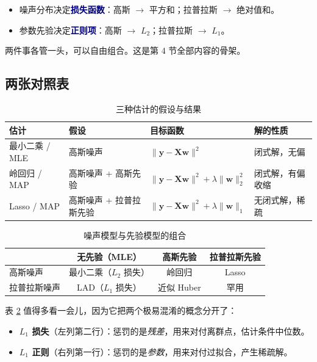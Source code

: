 \documentclass[11pt,a4paper,fontset=windows,zihao=-4]{ctexart}
\newcommand{\bX}{\mathbf{X}}
\newcommand{\by}{\mathbf{y}}
\newcommand{\bw}{\mathbf{w}}
\newcommand{\norm}[1]{\lVert #1\rVert}
\newcommand{\hl}[1]{\textcolor{navy}{\textbf{#1}}}
\newcommand{\tabhead}{\sffamily\bfseries\color{navy}}
\begin{document}
\begin{keybox}[对称的美感]
\begin{itemize}
  \item 噪声分布决定\hl{损失函数}：高斯 $\to$ 平方和；拉普拉斯 $\to$ 绝对值和。
  \item 参数先验决定\hl{正则项}：高斯 $\to$ $L_2$；拉普拉斯 $\to$ $L_1$。
\end{itemize}
两件事各管一头，可以自由组合。这是第 4 节全部内容的骨架。
\end{keybox}

\subsection{两张对照表}

\begin{table}[htbp]
\centering
\small
\caption{三种估计的假设与结果}
\label{tab:three}
\begin{tabular}{@{}llll@{}}
\toprule
\rowcolor{navy!7}
\tabhead 估计 & \tabhead 假设 & \tabhead 目标函数 & \tabhead 解的性质\\
\midrule
最小二乘 / MLE & 高斯噪声 & $\norm{\by-\bX\bw}^2$ & 闭式解，无偏\\
岭回归 / MAP & 高斯噪声 + 高斯先验 & $\norm{\by-\bX\bw}^2+\lambda\norm{\bw}_2^2$ & 闭式解，有偏收缩\\
Lasso / MAP & 高斯噪声 + 拉普拉斯先验 & $\norm{\by-\bX\bw}^2+\lambda\norm{\bw}_1$ & 无闭式解，稀疏\\
\bottomrule
\end{tabular}
\end{table}

\begin{table}[htbp]
\centering
\small
\caption{噪声模型与先验模型的组合}
\label{tab:combo}
\begin{tabular}{@{}lccc@{}}
\toprule
\rowcolor{navy!7}
\tabhead & \tabhead 无先验（MLE） & \tabhead 高斯先验 & \tabhead 拉普拉斯先验\\
\midrule
高斯噪声 & 最小二乘（$L_2$ 损失） & 岭回归 & Lasso\\
拉普拉斯噪声 & LAD（$L_1$ 损失） & 近似 Huber & 罕用\\
\bottomrule
\end{tabular}
\end{table}

表 \ref{tab:combo} 值得多看一会儿，因为它把两个极易混淆的概念分开了：

\begin{itemize}
  \item \textbf{$L_1$ 损失}（左列第二行）：惩罚的是\emph{残差}，用来对付离群点，估计条件中位数。
  \item \textbf{$L_1$ 正则}（右列第一行）：惩罚的是\emph{参数}，用来对付过拟合，产生稀疏解。
\end{itemize}
\end{document}

